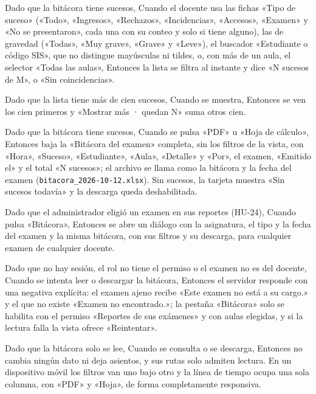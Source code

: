 {\item Dado que la bitácora tiene sucesos, Cuando el docente usa las fichas «Tipo de
      suceso» («Todo», «Ingresos», «Rechazos», «Incidencias», «Accesos», «Examen» y «No
      se presentaron», cada una con su conteo y solo si tiene alguno), las de gravedad
      («Todas», «Muy grave», «Grave» y «Leve»), el buscador «Estudiante o código SIS»,
      que no distingue mayúsculas ni tildes, o, con más de un aula, el selector «Todas
      las aulas», Entonces la lista se filtra al instante y dice «N sucesos de M», o
      «Sin coincidencias».
\item Dado que la lista tiene más de cien sucesos, Cuando se muestra, Entonces se ven
      los cien primeros y «Mostrar más · quedan N» suma otros cien.
\item Dado que la bitácora tiene sucesos, Cuando se pulsa «PDF» u «Hoja de cálculo»,
      Entonces baja la «Bitácora del examen» completa, sin los filtros de la vista, con
      «Hora», «Suceso», «Estudiante», «Aula», «Detalle» y «Por», el examen, «Emitido el»
      y el total «N sucesos»; el archivo se llama como la bitácora y la fecha del examen
      (\texttt{bitacora\_2026-10-12.xlsx}). Sin sucesos, la tarjeta muestra «Sin sucesos
      todavía» y la descarga queda deshabilitada.
\item Dado que el administrador eligió un examen en sus reportes (HU-24), Cuando pulsa
      «Bitácora», Entonces se abre un diálogo con la asignatura, el tipo y la fecha del
      examen y la misma bitácora, con sus filtros y su descarga, para cualquier examen
      de cualquier docente.
\item Dado que no hay sesión, el rol no tiene el permiso o el examen no es del docente,
      Cuando se intenta leer o descargar la bitácora, Entonces el servidor responde con
      una negativa explícita: el examen ajeno recibe «Este examen no está a su cargo.» y
      el que no existe «Examen no encontrado.»; la pestaña «Bitácora» solo se habilita
      con el permiso «Reportes de sus exámenes» y con aulas elegidas, y si la lectura
      falla la vista ofrece «Reintentar».
\item Dado que la bitácora solo se lee, Cuando se consulta o se descarga, Entonces no
      cambia ningún dato ni deja asientos, y sus rutas solo admiten lectura. En un
      dispositivo móvil los filtros van uno bajo otro y la línea de tiempo ocupa una
      sola columna, con «PDF» y «Hoja», de forma completamente responsiva.}

\def\HUMockupsPares{%
\CajaMockup{hu29-registrar-incidencia}{10.6cm} & \CajaMockup{hu29-registrar-incidencia-movil}{3.2cm} \\[4pt]
\hline
\CajaMockup{hu29-incidencia-no-prevista}{10.6cm} & \CajaMockup{hu29-incidencia-no-prevista-movil}{3.2cm} \\[4pt]
\hline
\CajaMockup{hu29-mis-incidencias}{10.6cm} & \CajaMockup{hu29-mis-incidencias-movil}{3.2cm} \\[4pt]
\hline
\CajaMockup{hu29-grabar-video}{10.6cm} & \CajaMockup{hu29-grabar-video-movil}{3.2cm} \\[4pt]
\hline
\CajaMockup{hu29-video-de-evidencia}{10.6cm} & \CajaMockup{hu29-video-de-evidencia-movil}{3.2cm} \\[4pt]
\hline}

